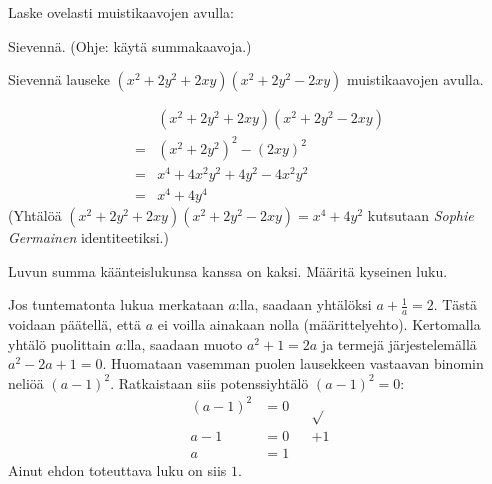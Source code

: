 \begin{tehtavasivu}
\begin{tehtava}
    Laske ovelasti muistikaavojen avulla:
    \begin{vastaus}
    \end{vastaus}
\end{tehtava}

\begin{tehtava}
    Sievennä. (Ohje: käytä summakaavoja.)
    \begin{vastaus}
    \end{vastaus}
\end{tehtava}

\begin{tehtava}
Sievennä lauseke $(x^2+2y^2+2xy)(x^2+2y^2-2xy)$ muistikaavojen avulla.
	\begin{vastaus}
	\begin{align*}
		&(x^2+2y^2+2xy)(x^2+2y^2-2xy) \\
		=&(x^2+2y^2)^2-(2xy)^2 \\
		=&x^4+4x^2y^2+4y^2-4x^2y^2 \\
		=&x^4+4y^4
	\end{align*}		
	(Yhtälöä $(x^2+2y^2+2xy)(x^2+2y^2-2xy)=x^4+4y^2$ kutsutaan \textit{Sophie Germainen} identiteetiksi.)
	\end{vastaus}
\end{tehtava}

\begin{tehtava}
Luvun summa käänteislukunsa kanssa on kaksi. Määritä kyseinen luku.
	\begin{vastaus}
	Jos tuntematonta lukua merkataan $a$:lla, saadaan yhtälöksi $a+\frac{1}{a}=2$. Tästä voidaan päätellä, että $a$ ei voilla ainakaan nolla (määrittelyehto). Kertomalla yhtälö puolittain $a$:lla, saadaan muoto $a^2+1=2a$ ja termejä järjestelemällä $a^2-2a+1=0$. Huomataan vasemman puolen lausekkeen vastaavan binomin neliöä $(a-1)^2$. Ratkaistaan siis potenssiyhtälö $(a-1)^2=0$:
	\begin{align*}
(a-1)^2&=0 &&\sqrt{ } \\
a-1&=0 &&+1 \\
a&=1 &&
	\end{align*}
	Ainut ehdon toteuttava luku on siis $1$.
	\end{vastaus}
\end{tehtava}


\end{tehtavasivu}
